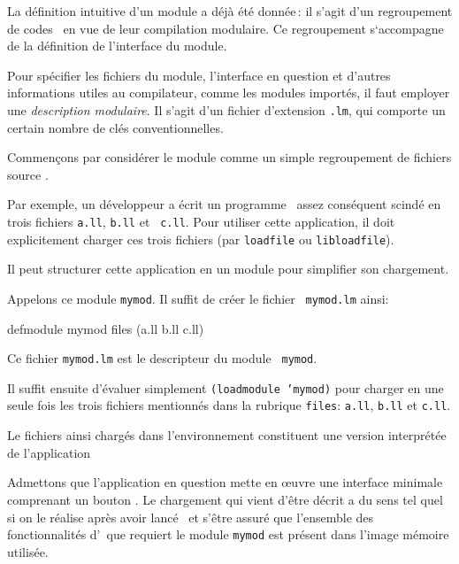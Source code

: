 
La d\'{e}finition intuitive d'un module a d\'{e}j\`{a} \'{e}t\'{e} donn\'{e}e\,:
il s'agit d'un regroupement de codes \LeLisp\ en vue
de leur compilation modulaire.
Ce regroupement s`accompagne de la d\'{e}finition de
l'interface du module.

Pour sp\'{e}cifier les fichiers du module, l'interface en question et
d'autres informations utiles au compilateur, comme les modules
import\'{e}s, il faut employer une {\em description modulaire}.
Il s'agit d'un fichier d'extension {\tt .lm}, qui comporte
un certain nombre de cl\'{e}s conventionnelles.




Commen\c{c}ons par consid\'{e}rer le module
comme un simple regroupement de fichiers source \LeLisp.

Par exemple, un d\'{e}veloppeur a \'{e}crit un programme \LeLisp\ assez
cons\'{e}quent scind\'{e} en trois fichiers {\tt a.ll}, {\tt b.ll} et {\tt
c.ll}. Pour utiliser cette application, il doit explicitement charger
ces trois fichiers (par {\tt loadfile} ou {\tt libloadfile}).

Il peut structurer cette application en un module pour simplifier son
chargement.

Appelons ce module {\tt mymod}. Il suffit de cr\'{e}er le fichier {\tt
mymod.lm} ainsi:

\begin{Code*}
defmodule mymod
files (a.ll b.ll c.ll)
\end{Code*}

Ce fichier {\tt mymod.lm} est le descripteur du module {\tt
mymod}.

Il suffit ensuite d'\'{e}valuer simplement {\tt (loadmodule 'mymod)} pour
charger en une seule fois les trois fichiers mentionn\'{e}s dans la
rubrique {\tt files}: {\tt a.ll}, {\tt b.ll} et {\tt c.ll}.

Le fichiers ainsi charg\'{e}s dans l'environnement constituent une
version interpr\'{e}t\'{e}e de l'application



Admettons que l'application en question mette en \oe uvre une interface
minimale comprenant un bouton \Aida.
Le chargement qui vient d'\^{e}tre d\'{e}crit a du sens tel quel si on le
r\'{e}alise apr\`{e}s avoir lanc\'{e} \Aida\ et s'\^{e}tre assur\'{e} que l'ensemble
des fonctionnalit\'{e}s d'\Aida\ que requiert le module {\tt mymod}
est pr\'{e}sent dans l'image m\'{e}moire utilis\'{e}e.

